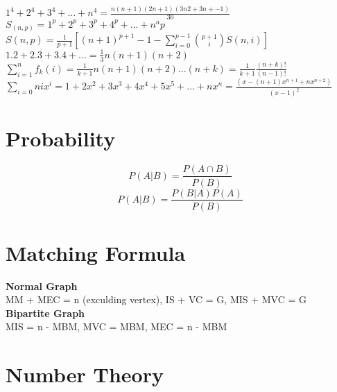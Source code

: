 \( 1^4+2^4+3^4+...+n^4=\frac{n(n+1)(2n+1)(3n2+3n+-1)}{30} \) \\
\( S_{(n, p)} = 1^p + 2^p + 3^p + 4^p + ... + n^ap \) \\
\( S(n, p) = \frac{1}{p + 1} [(n + 1)^{p + 1} - 1 - \sum_{i = 0}^{p - 1} \binom{p + 1}{i} S(n, i)] \) \\
\( 1.2 + 2.3 + 3.4 + ... = \frac{1}{3} n(n+1)(n+2) \) \\
\( \sum_{i=1}^n f_k(i) = \frac{1}{k+1} n(n+1)(n+2)...(n+k) = \frac{1}{k+1}\frac{(n+k)!}{(n-1)!} \) \\
\( \sum_{i=0}{n}ix^i = 1 + 2x^2 + 3x^3 + 4x^4 + 5x^5+ ... +nx^n = \frac{(x-(n+1)x^{n+1}+nx^{n+2})} {(x-1)^2} \) \\

\section{Probability}

\[ P(A|B) = \frac{P(A \cap B)}{P(B)} \]
\[ P(A|B) = \frac{P(B|A)P(A)}{P(B)} \]

\section{Matching Formula}

\textbf{Normal Graph} \\
MM + MEC = n (exculding vertex), IS + VC = G, MIS + MVC = G \\

\textbf{Bipartite Graph} \\
MIS = n - MBM, MVC = MBM, MEC = n - MBM \\

\section{Number Theory}

